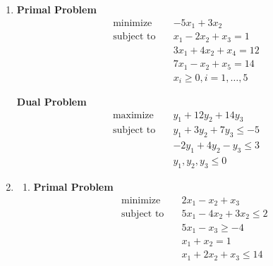 \begin{enumerate}
    \item           \begin{minipage}[t]{0.45\textwidth}
              \textbf{Primal Problem}
              \begin{align*}
                  \text{minimize} \quad   & -5x_1 + 3x_2                \\
                  \text{subject to} \quad & x_1 - 2x_2 + x_3 = 1        \\
                                          & 3x_1 + 4x_2 + x_4 = 12      \\
                                          & 7x_1 - x_2 + x_5 = 14       \\
                                          & x_i \geq 0, i = 1, \dots, 5
              \end{align*}
          \end{minipage}
          \hfill
          \begin{minipage}[t]{0.45\textwidth}
              \textbf{Dual Problem}
              \begin{align*}
                  \text{maximize} \quad   & y_1 + 12y_2 + 14y_3       \\
                  \text{subject to} \quad & y_1 + 3y_2 + 7y_3 \leq -5 \\
                                          & -2y_1 + 4y_2 - y_3 \leq 3 \\
                                          & y_1, y_2, y_3 \leq 0
              \end{align*}
          \end{minipage}
    \item \begin{enumerate}
              \item       \begin{minipage}[t]{0.45\textwidth}
                        \textbf{Primal Problem}
                        \begin{align*}
                            \text{minimize} \quad   & 2x_1 - x_2 + x_3          \\
                            \text{subject to} \quad & 5x_1 - 4x_2 + 3x_2 \leq 2 \\
                                                    & 5x_1 - x_3 \geq -4        \\
                                                    & x_1 + x_2 = 1             \\
                                                    & x_1 + 2x_2 + x_3 \leq 14  \\

\end{align*}
\end{minipage}
\end{enumerate}
\end{enumerate}
